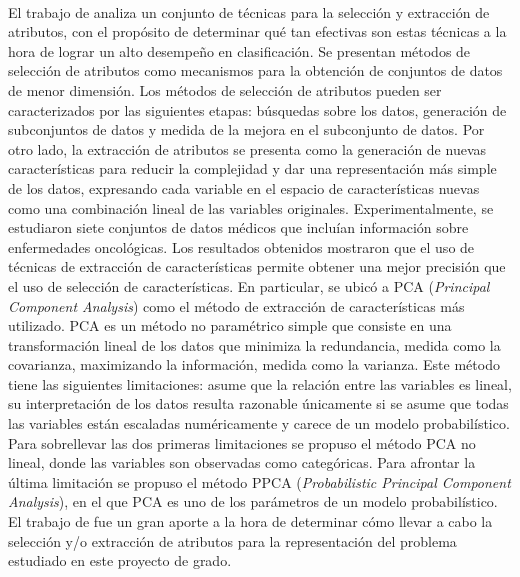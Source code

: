 \paragraph{}El trabajo de \citet{survey-feature-selection-extraction} analiza un conjunto de técnicas para la selección y extracción de atributos, con el propósito de determinar qué tan efectivas son estas técnicas a la hora de lograr un alto desempeño en clasificación.
Se presentan métodos de selección de atributos como mecanismos para la obtención de conjuntos de datos de menor dimensión.
Los métodos de selección de atributos pueden ser caracterizados por las siguientes etapas: búsquedas sobre los datos, generación de subconjuntos de datos y medida de la mejora en el subconjunto de datos.
Por otro lado, la extracción de atributos se presenta como la generación de nuevas características para reducir la complejidad y dar una representación más simple de los datos, expresando cada variable en el espacio de características nuevas como una combinación lineal de las variables originales.
Experimentalmente, se estudiaron siete conjuntos de datos médicos que incluían información sobre enfermedades oncológicas.
Los resultados obtenidos mostraron que el uso de técnicas de extracción de características permite obtener una mejor precisión que el uso de selección de características.
En particular, se ubicó a PCA (\textit{Principal Component Analysis}) como el método de extracción de características más utilizado.
PCA es un método no paramétrico simple que consiste en una transformación lineal de los datos que minimiza la redundancia, medida como la covarianza, maximizando la información, medida como la varianza.
Este método tiene las siguientes limitaciones: asume que la relación entre las variables es lineal, su interpretación de los datos resulta razonable únicamente si se asume que todas las variables están escaladas numéricamente y carece de un modelo probabilístico.
Para sobrellevar las dos primeras limitaciones se propuso el método PCA no lineal, donde las variables son observadas como categóricas.
Para afrontar la última limitación se propuso el método PPCA (\textit{Probabilistic Principal Component Analysis}), en el que PCA es uno de los parámetros de un modelo probabilístico. 
El trabajo de \citet{survey-feature-selection-extraction} fue un gran aporte a la hora de determinar cómo llevar a cabo la selección y/o extracción de atributos para la representación del problema estudiado en este proyecto de grado.


